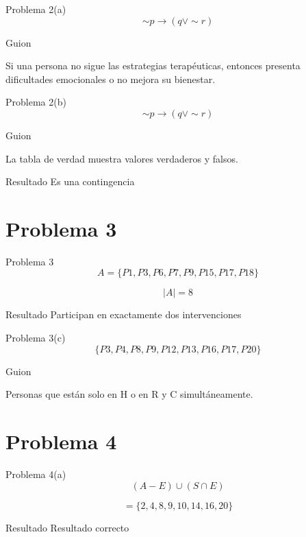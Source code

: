 \documentclass[aspectratio=169,10pt]{beamer}
\newcommand{\guion}[1]{
	\begin{block}{Guion}
		#1
	\end{block}
}
\newcommand{\resultado}[1]{
	\begin{alertblock}{Resultado}
		#1
	\end{alertblock}
}
\begin{document}
	\begin{frame}{Problema 2(a)}
		\[
		\sim p \to (q\lor \sim r)
		\]
		
		\guion{
			Si una persona no sigue las estrategias terapéuticas, entonces presenta dificultades emocionales o no mejora su bienestar.
		}
	\end{frame}
	
	\begin{frame}{Problema 2(b)}
		\[
		\sim p \to (q\lor \sim r)
		\]
		
		\guion{
			La tabla de verdad muestra valores verdaderos y falsos.
		}
		
		\resultado{Es una contingencia}
	\end{frame}
	
	\section{Problema 3}
	
	\begin{frame}{Problema 3}
		\[
		A=\{P1,P3,P6,P7,P9,P15,P17,P18\}
		\]
		
		\[
		|A|=8
		\]
		
		\resultado{Participan en exactamente dos intervenciones}
	\end{frame}
	
	\begin{frame}{Problema 3(c)}
		\[
		\{P3,P4,P8,P9,P12,P13,P16,P17,P20\}
		\]
		
		\guion{
			Personas que están solo en H o en R y C simultáneamente.
		}
	\end{frame}
	
	\section{Problema 4}
	
	\begin{frame}{Problema 4(a)}
		\[
		(A-E)\cup(S\cap E)
		\]
		
		\[
		= \{2,4,8,9,10,14,16,20\}
		\]
		
		\resultado{Resultado correcto}
	\end{frame}
	
\end{document}

